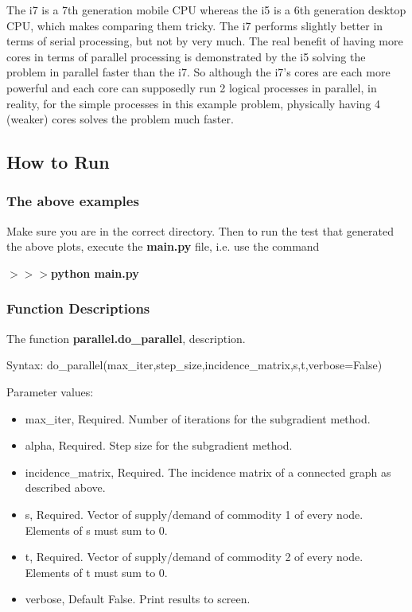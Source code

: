 \documentclass[12pt]{article}
\begin{document}
The i7 is a 7th generation mobile CPU whereas the i5 is a 6th generation desktop CPU, which makes comparing them tricky. The i7 performs slightly better in terms of serial processing, but not by very much. The real benefit of having more cores in terms of parallel processing is demonstrated by the i5 solving the problem in parallel faster than the i7. So although the i7's cores are each more powerful and each core can supposedly run 2 logical processes in parallel, in reality, for the simple processes in this example problem, physically having 4 (weaker) cores solves the problem much faster.

\subsection*{How to Run}

\subsubsection*{The above examples}

Make sure you are in the correct directory. Then to run the test that generated the above plots, execute the \textbf{main.py} file, i.e. use the command

\noindent \textbf{$>>>$python main.py}

\subsubsection*{Function Descriptions}

The function \textbf{parallel.do\_parallel}, description.

Syntax: do\_parallel(max\_iter,step\_size,incidence\_matrix,s,t,verbose=False)

Parameter values:
\begin{itemize}
	\item max\_iter, Required. Number of iterations for the subgradient method.
	\item alpha, Required. Step size for the subgradient method.
	\item incidence\_matrix, Required. The incidence matrix of a connected graph as described above.
	\item s, Required. Vector of supply/demand of commodity 1 of every node. Elements of s must sum to 0.
	\item t, Required. Vector of supply/demand of commodity 2 of every node. Elements of t must sum to 0.
	\item verbose, Default False. Print results to screen.
\end{itemize}
\end{document}
